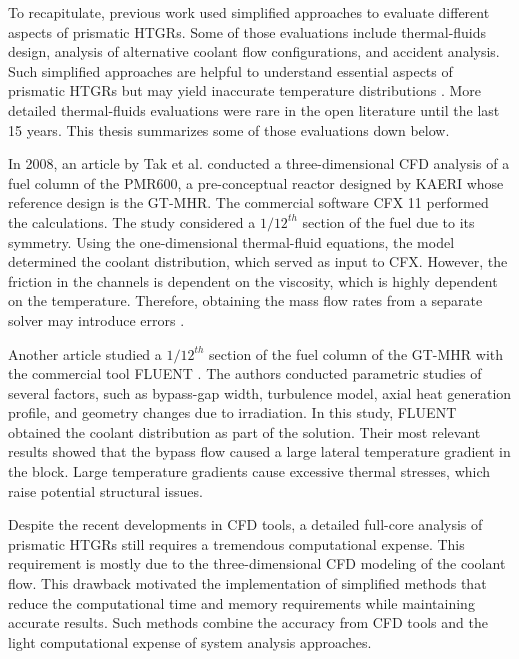 To recapitulate, previous work used simplified approaches to evaluate different aspects of prismatic HTGRs.
Some of those evaluations include thermal-fluids design, analysis of alternative coolant flow configurations, and accident analysis.
Such simplified approaches are helpful to understand essential aspects of prismatic HTGRs but may yield inaccurate temperature distributions \cite{tak_numerical_2008}.
More detailed thermal-fluids evaluations were rare in the open literature until the last 15 years.
This thesis summarizes some of those evaluations down below.

In 2008, an article by Tak et al. \cite{tak_numerical_2008} conducted a three-dimensional CFD analysis of a fuel column of the PMR600, a pre-conceptual reactor designed by \gls{KAERI} whose reference design is the GT-MHR.
The commercial software CFX 11 \cite{ansys_incorporated_cfx_2006} performed the calculations.
The study considered a $1/12^{th}$ section of the fuel due to its symmetry.
Using the one-dimensional thermal-fluid equations, the model determined the coolant distribution, which served as input to CFX.
However, the friction in the channels is dependent on the viscosity, which is highly dependent on the temperature.
Therefore, obtaining the mass flow rates from a separate solver may introduce errors \cite{sato_computational_2010}.

Another article \cite{sato_computational_2010} studied a $1/12^{th}$ section of the fuel column of the GT-MHR with the commercial tool FLUENT \cite{fluent_inc_fluent_2006}.
The authors conducted parametric studies of several factors, such as bypass-gap width, turbulence model, axial heat generation profile, and geometry changes due to irradiation.
In this study, FLUENT obtained the coolant distribution as part of the solution.
Their most relevant results showed that the bypass flow caused a large lateral temperature gradient in the block.
Large temperature gradients cause excessive thermal stresses, which raise potential structural issues.

Despite the recent developments in CFD tools, a detailed full-core analysis of prismatic HTGRs still requires a tremendous computational expense.
This requirement is mostly due to the three-dimensional CFD modeling of the coolant flow.
This drawback motivated the implementation of simplified methods that reduce the computational time and memory requirements while maintaining accurate results.
Such methods combine the accuracy from CFD tools and the light computational expense of system analysis approaches.

